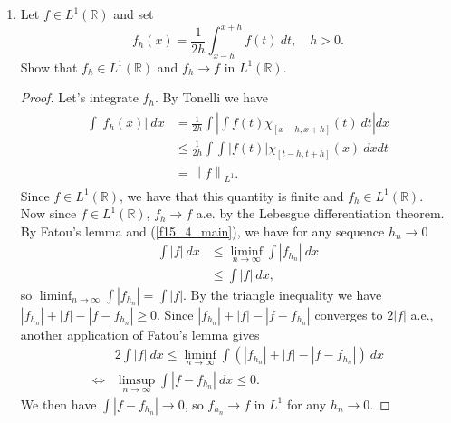 \documentclass[11pt,letterpaper]{report}
\newcommand{\reals}{\mathbb{R}}
\newcommand{\Lp}[2]{\left\|{#1}\right\|_{L^{#2}}}
\begin{document}
\begin{enumerate}
	\item Let $f\in L^1(\reals)$ and set
	\[
	f_h(x) = \frac{1}{2h}\int_{x-h}^{x+h}f(t)\ dt,\quad h>0.
	\]
	Show that $f_h\in L^1(\reals)$ and $f_h\to f$ in $L^1(\reals)$.
	\begin{proof}
		Let's integrate $f_h$. By Tonelli we have
		\begin{align}\label{f15_4_main}
		\begin{split}
			\int |f_h(x)|\ dx &= \frac{1}{2h}\int\left|\int f(t)\chi_{[x-h, x+h]}(t)\ dt\right|dx\\
			&\leq \frac{1}{2h}\int\int |f(t)|\chi_{[t-h, t+h]}(x)\ dxdt\\
			&= \Lp{f}{1}.
		\end{split}
		\end{align}
		Since $f\in L^1(\reals)$, we have that this quantity is finite and $f_h\in L^1(\reals)$.\\

		\noindent Now since $f\in L^1(\reals)$, $f_h\to f$ a.e. by the Lebesgue differentiation theorem. By Fatou's lemma and (\ref{f15_4_main}), we have for any sequence $h_n\to 0$
		\begin{align*}
			\int |f|\ dx &\leq \liminf_{n\to \infty}\int |f_{h_n}|\ dx\\
			&\leq \int |f|\ dx,
		\end{align*}
		so $\liminf_{n\to \infty} \int|f_{h_n}| = \int|f|$. By the triangle inequality we have $|f_{h_n}| + |f| - |f-f_{h_n}|\geq 0$. Since $|f_{h_n}|+|f| - |f-f_{h_n}|$ converges to $2|f|$ a.e., another application of Fatou's lemma gives
		\begin{align*}
		&2\int|f|\ dx \leq \liminf_{n\to \infty}\int(|f_{h_n}| + |f| - |f-f_{h_n}|)\ dx\\
		\iff&\limsup_{n\to \infty} \int |f-f_{h_n}|\ dx\leq 0.
		\end{align*}
		We then have $\int |f-f_{h_n}|\to 0$, so $f_{h_n}\to f$ in $L^1$ for any $h_n\to 0$.
	\end{proof}


\end{enumerate}
\end{document}
